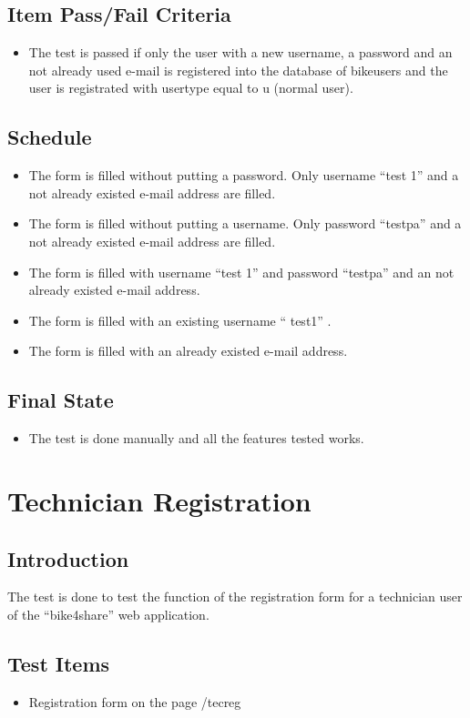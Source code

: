 \documentclass{article}
\begin{document}
\subsection{Item Pass/Fail Criteria}
\begin{itemize}
    \item The test is passed if only the user with a new username, a password and an not already used e-mail is registered into the database of bike\textunderscore users and the user is registrated with user\textunderscore type equal to u (normal user). 
\end{itemize}
\subsection{Schedule}
\begin{itemize}
    \item The form is filled without putting a password. Only username “test 1” and a not already existed e-mail address are filled.
    \item The form is filled without putting a username. Only password “testpa” and a not already existed e-mail address are filled.
    \item The form is filled with username “test 1” and password “testpa” and an not already existed e-mail address.
    \item The form is filled with an existing username “ test1” .
    \item The form is filled with an already existed e-mail address.
\end{itemize}
\subsection{Final State}
\begin{itemize}
    \item The test is done manually and all the features tested works.
\end{itemize}

\section{Technician Registration}
\subsection{Introduction}
The test is done to test the function of the registration form for a technician user of the “bike4share” web application.
\subsection{Test Items}
\begin{itemize}
    \item Registration form on the page /tec\textunderscore reg
\end{itemize}
\end{document}
